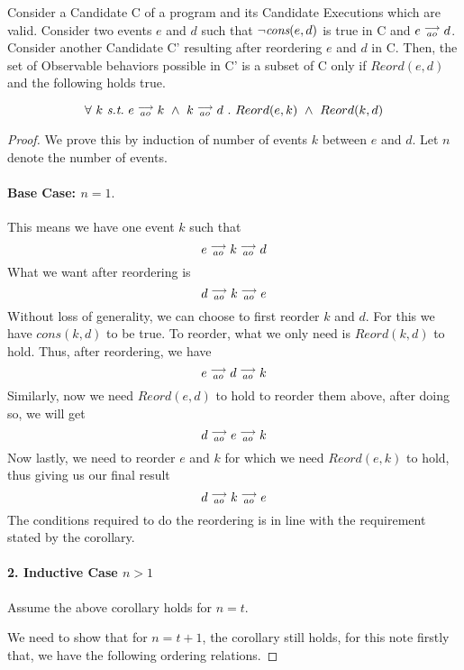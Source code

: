 \begin{corollary}
    Consider a Candidate C of a program and its Candidate Executions which are valid. Consider two events $e$ and $d$ such that $\neg \textit{cons}(e,d)$ is true in C and $e\stackrel{\longrightarrow}{_{ao}}d$. 
    Consider another Candidate C' resulting after reordering $e$ and $d$ in C. 
    Then, the set of Observable behaviors possible in C' is a subset of C only if $Reord(e,d)$ and the following holds true.
    
    \[
        \forall \ k \ \textit{s.t.} \ 
        \reln{e}{ao}{k} \ \wedge \ \reln{k}{ao}{d} \ . \ 
        Reord(e,k) \ \wedge \ Reord(k,d)
    \]
    
    \label{corol1}
\end{corollary}
    
\begin{proof}
    We prove this by induction of number of events $k$ between $e$ and $d$. Let $n$ denote the number of events.

    \paragraph{Base Case: $n = 1.$}
        This means we have one event $k$ such that
            \[
                e\stackrel{\longrightarrow}{_{ao}}k\stackrel{\longrightarrow}{_{ao}}d 
            \]
        What we want after reordering is 
        \[
            d\stackrel{\longrightarrow}{_{ao}}k\stackrel{\longrightarrow}{_{ao}}e 
        \]
        Without loss of generality, we can choose to first reorder $k$ and $d$. For this we have $cons(k,d)$ to be true. To reorder, what we only need is $Reord(k,d)$ to hold. Thus, after reordering, we have
        \[
            e\stackrel{\longrightarrow}{_{ao}}d\stackrel{\longrightarrow}{_{ao}}k 
        \]
        Similarly, now we need $Reord(e,d)$ to hold to reorder them above, after doing so, we will get
        \[
            d\stackrel{\longrightarrow}{_{ao}}e\stackrel{\longrightarrow}{_{ao}}k 
        \]
        Now lastly, we need to reorder $e$ and $k$ for which we need $Reord(e,k)$ to hold, thus giving us our final result
        \[
            d\stackrel{\longrightarrow}{_{ao}}k\stackrel{\longrightarrow}{_{ao}}e 
        \]
        The conditions required to do the reordering is in line with the requirement stated by the corollary. 

    \paragraph{2. Inductive Case $n > 1$}
        Assume the above corollary holds for $n = t$. 
        
        We need to show that for $n = t + 1$, the corollary still holds, for this note firstly that, we have the following ordering relations. 
        

\end{proof}
